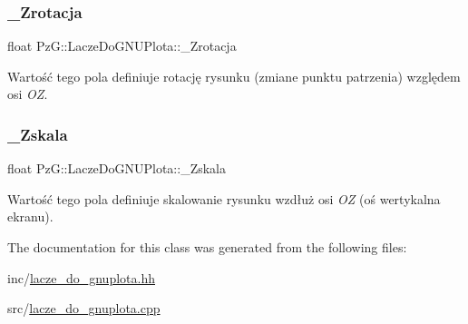 \subsubsection{\texorpdfstring{\+\_\+\+Zrotacja}{\_Zrotacja}}
{\footnotesize\ttfamily float Pz\+G\+::\+Lacze\+Do\+G\+N\+U\+Plota\+::\+\_\+\+Zrotacja\hspace{0.3cm}{\ttfamily [protected]}}

Wartość tego pola definiuje rotację rysunku (zmiane punktu patrzenia) względem osi {\itshape OZ}. \mbox{\label{classPzG_1_1LaczeDoGNUPlota_a85446d06b2d714b2f852ef43c47c73c1}} 
\subsubsection{\texorpdfstring{\+\_\+\+Zskala}{\_Zskala}}
{\footnotesize\ttfamily float Pz\+G\+::\+Lacze\+Do\+G\+N\+U\+Plota\+::\+\_\+\+Zskala\hspace{0.3cm}{\ttfamily [protected]}}

Wartość tego pola definiuje skalowanie rysunku wzdłuż osi {\itshape OZ} (oś wertykalna ekranu). 

The documentation for this class was generated from the following files\+:\begin{DoxyCompactItemize}
\item 
inc/\hyperlink{lacze__do__gnuplota_8hh}{lacze\+\_\+do\+\_\+gnuplota.\+hh}\item 
src/\hyperlink{lacze__do__gnuplota_8cpp}{lacze\+\_\+do\+\_\+gnuplota.\+cpp}\end{DoxyCompactItemize}
